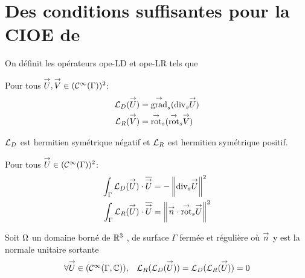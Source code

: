 \section[Des CSU pour la CIOE de Aubakirov 2014]{Des conditions suffisantes pour la CIOE de \cite{aubakirov_electromagnetic_2014}}

  \begin{defn}
    On définit les opérateurs \gls{ope-LD} et \gls{ope-LR} tels que %

    Pour tous \(\vect U,\vect V \in (\mathcal{C}^\infty(\Gamma))^2\): 
    \begin{align*}
      \LD(\vect U) &= \tgrads (\tdivs \vect U)
      \\
      \LR(\vect V) &= \tvrots( \tvrots \vect V)
    \end{align*}
  \end{defn}

  \begin{prop}
    \(\LD\) est hermitien symétrique négatif et \(\LR\) est hermitien symétrique positif.

    Pour tous \(\vect U \in (\mathcal{C}^\infty(\Gamma))^2\): 
    \begin{align*}
      \int_\Gamma \LD(\vect U)\cdot \conj{\vect U} &= -\norm{\tdivs \vect U}^2
      \\
      \int_\Gamma \LR(\vect U)\cdot \conj{\vect U} &=\norm{\vn \cdot \tvrots \vect U}^2
    \end{align*}
  \end{prop}

  \begin{prop}
    Soit \(\OO\) un domaine borné de \(\RR^3\) , de surface \(\Gamma\) fermée et régulière où \(\vect n\) y est la normale unitaire
    sortante
    \begin{equation}
      \begin{matrix}
        \forall \vect U \in (\mathcal{C}^\infty(\Gamma,\CC)) ,& \LR(\LD(\vect U)) = \LD(\LR(\vect U)) = 0
      \end{matrix}
    \end{equation}
  \end{prop}

